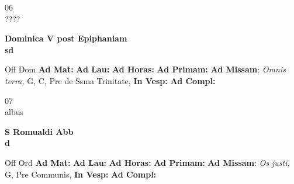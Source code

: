 \documentclass[10pt, openany]{book}
\begin{document}
    \begin{center}
        \begin{minipage}{3.5in}
            \vspace{2em}
            \begin{minipage}{0.5in}
                {\Huge 06} \\
                {\normalsize ????}
            \end{minipage}
            \begin{minipage}{3.0in}
                \textbf{ \large Dominica V post Epiphaniam \\
                \textnormal{\normalsize sd}}

            \end{minipage}
            \begin{justify}Off Dom
                \textbf{Ad Mat: }
                \textbf{Ad Lau: }
                \textbf{Ad Horas: }
                \textbf{Ad Primam: }\textbf{Ad Missam}: \textit{Omnis terra,} G, C, Pre de Ssma Trinitate, 
                \textbf{In Vesp: }
                \textbf{Ad Compl: }
            \end{justify}
        \end{minipage}
    \end{center}

    \begin{center}
        \begin{minipage}{3.5in}
            \vspace{2em}
            \begin{minipage}{0.5in}
                {\Huge 07} \\
                {\normalsize albus}
            \end{minipage}
            \begin{minipage}{3.0in}
                \textbf{ \large S Romualdi Abb \\
                \textnormal{\normalsize d}}

            \end{minipage}
            \begin{justify}Off Ord
                \textbf{Ad Mat: }
                \textbf{Ad Lau: }
                \textbf{Ad Horas: }
                \textbf{Ad Primam: }\textbf{Ad Missam}: \textit{Os justi,} G, Pre Communis, 
                \textbf{In Vesp: }
                \textbf{Ad Compl: }
            \end{justify}
        \end{minipage}
    \end{center}
\end{document}
